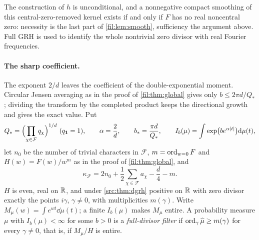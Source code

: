 \begin{remark}\label{fil:rem:positivity}
The construction of $h$ is unconditional, and a nonnegative compact smoothing of this central-zero-removed
kernel exists if and only if $F$ has no real noncentral zero: necessity is the last part of
\cref{fil:lem:smooth}, sufficiency the argument above. Full GRH is used to identify the whole nontrivial zero
divisor with real Fourier frequencies.
\end{remark}

\paragraph{The sharp coefficient.}
The exponent $2/d$ leaves the coefficient of the double-exponential moment. Circular Jensen averaging as in
the proof of \cref{fil:thm:global} gives only $b\le2\pi d/Q_*$; dividing the transform by the completed product
keeps the directional growth and gives the exact value. Put
\[
 Q_*=\Bigl(\prod_{\chi\in\mathcal F}q_\chi\Bigr)^{1/d}\ (q_{\mathbf{1}}=1),\qquad \alpha=\frac2d,\qquad b_*=\frac{\pi d}{Q_*},
 \qquad I_b(\mu)=\int\exp\bigl(be^{\alpha\lvert t\rvert}\bigr)\mathrm{d}\mu(t),
\]
let $n_0$ be the number of trivial characters in $\mathcal F$, $m=\operatorname{ord}_{w=0}F$ and $H(w)=F(w)/w^m$ as in the proof
of \cref{fil:thm:global}, and
\[
 \kappa_{\mathcal F}=2n_0+\frac12\sum_{\chi\in\mathcal F}a_\chi-\frac d4-m .
\]
$H$ is even, real on $\mathbb{R}$, and under \cref{src:thm:dgrh} positive on $\mathbb{R}$ with zero divisor exactly the points
$i\gamma$, $\gamma\ne0$, with multiplicities $m(\gamma)$. Write $M_\mu(w)=\int e^{wt}\dd\mu(t)$; a finite $I_b(\mu)$
makes $M_\mu$ entire. A probability measure $\mu$ with $I_b(\mu)<\infty$ for some $b>0$ is a \emph{full-divisor
filter} if $\operatorname{ord}_\gamma\widehat\mu\ge m(\gamma)$ for every $\gamma\ne0$, that is, if $M_\mu/H$ is entire.

